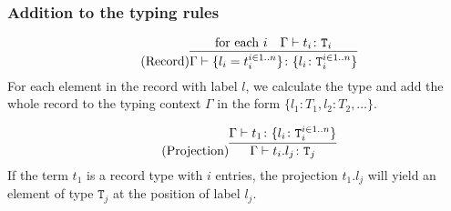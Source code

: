 \subsubsection{Addition to the typing rules \cite{pierce2002ProgLang}}
\begin{equation*}
    \tag{Record}
    \infer{
    \Gamma \vdash \{l_i = t_i^{i \in 1..n}\} \colon \{l_i \colon \texttt{T}_i^{i \in 1..n}\}
    }{
    \text{for each } i & \Gamma \vdash t_i \colon \texttt{T}_i
    }
\end{equation*}
For each element in the record with label $l$, we calculate the type
and add the whole record to the typing context $\Gamma$ in the form
$\{l_1 \colon T_1, l_2 \colon T_2, \dots\}$.

\begin{equation*}
    \tag{Projection}
    \infer{
    \Gamma \vdash t_i . l_j \colon \texttt{T}_j
    }{
    \Gamma \vdash t_1 \colon \{l_i \colon \texttt{T}_i^{i \in 1..n}\}
    }
\end{equation*}
If the term $t_1$ is a record type with $i$ entries, the projection
$t_1 . l_j$ will yield an element of type $\texttt{T}_j$ at
the position of label $l_j$.
